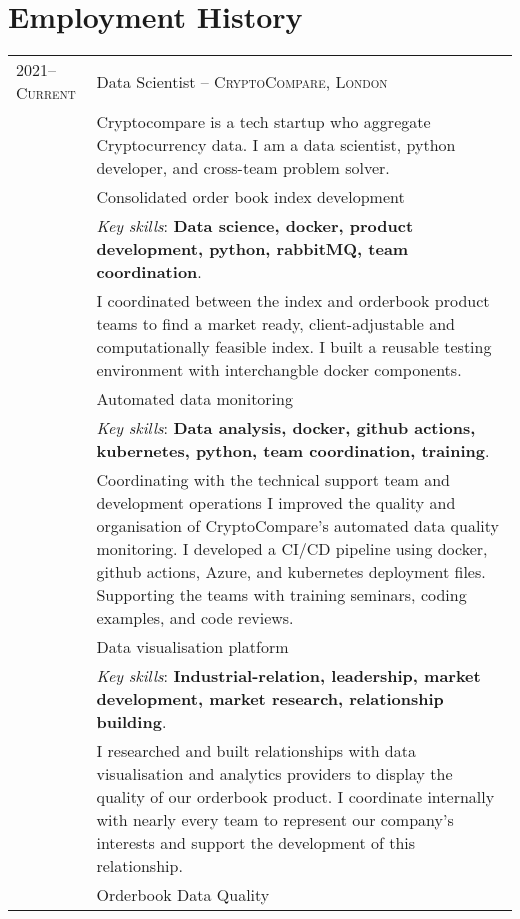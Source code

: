 \documentclass[a4paper,10pt]{article}
\newcommand{\tab}{\hspace{10 pt}}
\begin{document}
\section{Employment History}
\begin{tabular}{p{2.25cm}|p{15cm}}
%
%	
	\textsc{2021--Current} & Data Scientist -- \textsc{CryptoCompare, London}\\
	 & \footnotesize{Cryptocompare is a tech startup who aggregate Cryptocurrency data. I am a data scientist, python developer, and cross-team problem solver.}\\
	 & \tab Consolidated order book index development\\
	 & \footnotesize{\emph{Key skills}: \textbf{Data science, docker, product development, python, rabbitMQ, team coordination}.}\\
	 & \footnotesize{I coordinated between the index and orderbook product teams to find a market ready, client-adjustable and computationally feasible index. I built a reusable testing environment with interchangble docker components.\vspace{0.05 in}}\\
	 & \tab Automated data monitoring\\
	 & \footnotesize{\emph{Key skills}: \textbf{Data analysis, docker, github actions, kubernetes, python, team coordination, training}.}\\
	 & \footnotesize{Coordinating with the technical support team and development operations I improved the quality and organisation of CryptoCompare’s automated data quality monitoring. I developed a CI/CD pipeline using docker, github actions, Azure, and kubernetes deployment files. Supporting the teams with training seminars, coding examples, and code reviews.} \vspace{0.05 in}\\	 
	 & \tab Data visualisation platform\\
	 & \footnotesize{\emph{Key skills}: \textbf{Industrial-relation, leadership, market development, market research, relationship building}.}\\
	 & \footnotesize{I researched and built relationships with data visualisation and analytics providers to display the quality of our orderbook product. I coordinate internally with nearly every team to represent our company's interests and support the development of this relationship.} \vspace{0.05 in}\\	
	 & \tab Orderbook Data Quality\\

\end{tabular}
\end{document}
